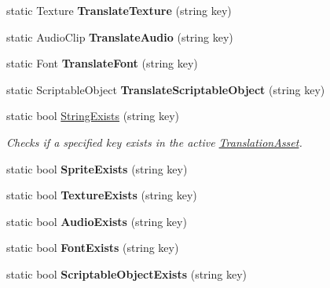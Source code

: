 \begin{DoxyCompactItemize}
\item 
static Texture {\bfseries Translate\+Texture} (string key)\hypertarget{class_translator_a1ba8fdf6f85183cc8a9b7ea8864745ad}{}\label{class_translator_a1ba8fdf6f85183cc8a9b7ea8864745ad}

\item 
static Audio\+Clip {\bfseries Translate\+Audio} (string key)\hypertarget{class_translator_aa273a1c9abeb6f6d4a04feff6fafb47a}{}\label{class_translator_aa273a1c9abeb6f6d4a04feff6fafb47a}

\item 
static Font {\bfseries Translate\+Font} (string key)\hypertarget{class_translator_a63c906f2f68d566b0a3ad74b2ffe6848}{}\label{class_translator_a63c906f2f68d566b0a3ad74b2ffe6848}

\item 
static Scriptable\+Object {\bfseries Translate\+Scriptable\+Object} (string key)\hypertarget{class_translator_a9e75595771387b38be82c65be76a0d9e}{}\label{class_translator_a9e75595771387b38be82c65be76a0d9e}

\item 
static bool \hyperlink{class_translator_acaf6656c18f9538158b9a413808f2e2e}{String\+Exists} (string key)
\begin{DoxyCompactList}\small\item\em Checks if a specified key exists in the active \hyperlink{class_translation_asset}{Translation\+Asset}. \end{DoxyCompactList}\item 
static bool {\bfseries Sprite\+Exists} (string key)\hypertarget{class_translator_a4e5a05f181d4b72fa7212d2b16dd1f5a}{}\label{class_translator_a4e5a05f181d4b72fa7212d2b16dd1f5a}

\item 
static bool {\bfseries Texture\+Exists} (string key)\hypertarget{class_translator_a6c183df20ca75fade9c693c6ce184597}{}\label{class_translator_a6c183df20ca75fade9c693c6ce184597}

\item 
static bool {\bfseries Audio\+Exists} (string key)\hypertarget{class_translator_a4979b15c32d4a64a78bd9b4f87149159}{}\label{class_translator_a4979b15c32d4a64a78bd9b4f87149159}

\item 
static bool {\bfseries Font\+Exists} (string key)\hypertarget{class_translator_a789e64d3f13d19941c75202c95bccc68}{}\label{class_translator_a789e64d3f13d19941c75202c95bccc68}

\item 
static bool {\bfseries Scriptable\+Object\+Exists} (string key)\hypertarget{class_translator_a42e0799feb3a6cb8150c64cd9bbdd06e}{}\label{class_translator_a42e0799feb3a6cb8150c64cd9bbdd06e}

\end{DoxyCompactItemize}

